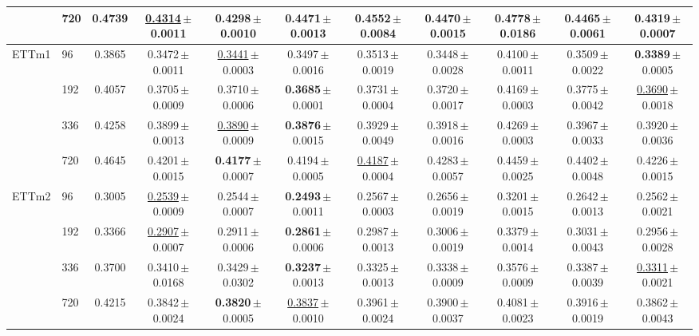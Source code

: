 \begin{tabular}{llccccccccc}
 & 720 & 0.4739 & \underline{0.4314}\,{\tiny$\pm$0.0011} & \textbf{0.4298}\,{\tiny$\pm$0.0010} & 0.4471\,{\tiny$\pm$0.0013} & 0.4552\,{\tiny$\pm$0.0084} & 0.4470\,{\tiny$\pm$0.0015} & 0.4778\,{\tiny$\pm$0.0186} & 0.4465\,{\tiny$\pm$0.0061} & 0.4319\,{\tiny$\pm$0.0007} \\
\midrule
\multirow{4}{*}{ETTm1} & 96 & 0.3865 & 0.3472\,{\tiny$\pm$0.0011} & \underline{0.3441}\,{\tiny$\pm$0.0003} & 0.3497\,{\tiny$\pm$0.0016} & 0.3513\,{\tiny$\pm$0.0019} & 0.3448\,{\tiny$\pm$0.0028} & 0.4100\,{\tiny$\pm$0.0011} & 0.3509\,{\tiny$\pm$0.0022} & \textbf{0.3389}\,{\tiny$\pm$0.0005} \\
 & 192 & 0.4057 & 0.3705\,{\tiny$\pm$0.0009} & 0.3710\,{\tiny$\pm$0.0006} & \textbf{0.3685}\,{\tiny$\pm$0.0001} & 0.3731\,{\tiny$\pm$0.0004} & 0.3720\,{\tiny$\pm$0.0017} & 0.4169\,{\tiny$\pm$0.0003} & 0.3775\,{\tiny$\pm$0.0042} & \underline{0.3690}\,{\tiny$\pm$0.0018} \\
 & 336 & 0.4258 & 0.3899\,{\tiny$\pm$0.0013} & \underline{0.3890}\,{\tiny$\pm$0.0009} & \textbf{0.3876}\,{\tiny$\pm$0.0015} & 0.3929\,{\tiny$\pm$0.0049} & 0.3918\,{\tiny$\pm$0.0016} & 0.4269\,{\tiny$\pm$0.0003} & 0.3967\,{\tiny$\pm$0.0033} & 0.3920\,{\tiny$\pm$0.0036} \\
 & 720 & 0.4645 & 0.4201\,{\tiny$\pm$0.0015} & \textbf{0.4177}\,{\tiny$\pm$0.0007} & 0.4194\,{\tiny$\pm$0.0005} & \underline{0.4187}\,{\tiny$\pm$0.0004} & 0.4283\,{\tiny$\pm$0.0057} & 0.4459\,{\tiny$\pm$0.0025} & 0.4402\,{\tiny$\pm$0.0048} & 0.4226\,{\tiny$\pm$0.0015} \\
\midrule
\multirow{4}{*}{ETTm2} & 96 & 0.3005 & \underline{0.2539}\,{\tiny$\pm$0.0009} & 0.2544\,{\tiny$\pm$0.0007} & \textbf{0.2493}\,{\tiny$\pm$0.0011} & 0.2567\,{\tiny$\pm$0.0003} & 0.2656\,{\tiny$\pm$0.0019} & 0.3201\,{\tiny$\pm$0.0015} & 0.2642\,{\tiny$\pm$0.0013} & 0.2562\,{\tiny$\pm$0.0021} \\
 & 192 & 0.3366 & \underline{0.2907}\,{\tiny$\pm$0.0007} & 0.2911\,{\tiny$\pm$0.0006} & \textbf{0.2861}\,{\tiny$\pm$0.0006} & 0.2987\,{\tiny$\pm$0.0013} & 0.3006\,{\tiny$\pm$0.0019} & 0.3379\,{\tiny$\pm$0.0014} & 0.3031\,{\tiny$\pm$0.0043} & 0.2956\,{\tiny$\pm$0.0028} \\
 & 336 & 0.3700 & 0.3410\,{\tiny$\pm$0.0168} & 0.3429\,{\tiny$\pm$0.0302} & \textbf{0.3237}\,{\tiny$\pm$0.0013} & 0.3325\,{\tiny$\pm$0.0013} & 0.3338\,{\tiny$\pm$0.0009} & 0.3576\,{\tiny$\pm$0.0009} & 0.3387\,{\tiny$\pm$0.0039} & \underline{0.3311}\,{\tiny$\pm$0.0021} \\
 & 720 & 0.4215 & 0.3842\,{\tiny$\pm$0.0024} & \textbf{0.3820}\,{\tiny$\pm$0.0005} & \underline{0.3837}\,{\tiny$\pm$0.0010} & 0.3961\,{\tiny$\pm$0.0024} & 0.3900\,{\tiny$\pm$0.0037} & 0.4081\,{\tiny$\pm$0.0023} & 0.3916\,{\tiny$\pm$0.0019} & 0.3862\,{\tiny$\pm$0.0043} \\

\end{tabular}
